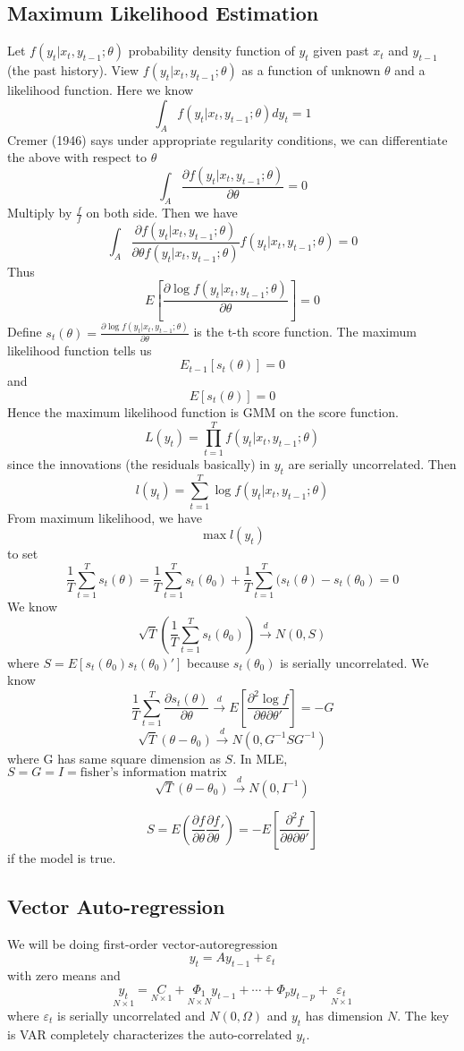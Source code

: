 \documentclass[11pt, a4paper, oneside]{article}
\theoremstyle{definition}
\theoremstyle{proposition}
\theoremstyle{corollary}
\theoremstyle{lemma}
\theoremstyle{theorem}
\begin{document}
\subsection{Maximum Likelihood Estimation}
Let $f(y_t|x_t, y_{t-1}; \theta)$ probability density function of $y_t$ given past $x_t$ and $y_{t-1}$ (the past history). View $f(y_t|x_t, y_{t-1}; \theta)$ as a function of unknown $\theta$ and a likelihood function. Here we know
$$\int_A f(y_t|x_t, y_{t-1}; \theta)d y_t = 1$$ 
Cremer (1946) says under appropriate regularity conditions, we can differentiate the above with respect to $\theta$
$$\int_A \frac{\partial f(y_t|x_t, y_{t-1}; \theta)}{\partial \theta} = 0$$ Multiply by $\frac{f}{f}$ on both side. Then we have
$$\int_A \frac{\partial f(y_t|x_t, y_{t-1}; \theta)}{\partial \theta f(y_t|x_t, y_{t-1}; \theta)} f(y_t|x_t, y_{t-1}; \theta) = 0$$
Thus
$$E\left[\frac{\partial \log f(y_t|x_t, y_{t-1}; \theta)}{\partial \theta}\right] = 0$$
Define $s_t(\theta) = \frac{\partial \log f(y_t|x_t, y_{t-1}; \theta)}{\partial \theta}$ is the t-th score function. The maximum likelihood function tells us
$$E_{t-1}[s_t(\theta)] = 0$$ and $$E[s_t(\theta)] = 0$$
Hence the maximum likelihood function is GMM on the score function. 
$$L(y_t) = \prod_{t=1}^T f(y_t|x_t, y_{t-1}; \theta)$$ since the innovations (the residuals basically) in $y_t$ are serially uncorrelated. Then 
$$l(y_t) = \sum_{t=1}^T \log f(y_t|x_t, y_{t-1}; \theta)$$
From maximum likelihood, we have
$$\max l(y_t)$$ to set 
$$\frac{1}{T}\sum_{t=1}^T s_t(\theta) = \frac{1}{T}\sum_{t=1}^T s_t(\theta_0) + \frac{1}{T}\sum_{t=1}^T (s_t(\theta)  - s_t(\theta_0)=0$$
We know $$\sqrt{T}(\frac{1}{T}\sum_{t=1}^T s_t(\theta_0)) \overset{d}{\to} N(0, S)$$
where $S = E[s_t(\theta_0)s_t(\theta_0)']$ because $s_t(\theta_0)$ is serially uncorrelated. We know
$$\frac{1}{T}\sum_{t=1}^T \frac{\partial s_t(\theta)}{\partial \theta} \overset{d}{\to} E\left[\frac{\partial^2 \log f}{\partial \theta\partial \theta'}\right] =  -G$$
$$\sqrt{T}(\theta - \theta_0) \overset{d}{\to} N(0, G^{-1}SG^{-1})$$ where G has same square dimension as $S$. 
In MLE, $S = G = I = \text{fisher's information matrix}$ 
$$\sqrt{T}(\theta -\theta_0) \overset{d}{\to} N(0, I^{-1})$$

$$S = E\left(\frac{\partial f}{\partial \theta} \frac{\partial f}{\partial \theta}'\right) = -E\left[\frac{\partial^2 f}{\partial \theta \partial \theta'}\right]$$ if the model is true. 

\subsection{Vector Auto-regression}
We will be doing first-order vector-autoregression $$y_t = Ay_{t-1} +\varepsilon_t$$ with zero means and
$$\underset{N \times 1}{y_t} = \underset{N \times 1}{C} + \underset{N \times N}{\Phi_1} y_{t-1} + \cdots + \Phi_p y_{t -p} + \underset{N \times 1}{\varepsilon_t}$$ 
where $\varepsilon_t$ is serially uncorrelated and $N(0, \Omega)$ and $y_t$ has dimension $N$. 
The key is VAR completely characterizes the auto-correlated $y_t$. 
\end{document}
